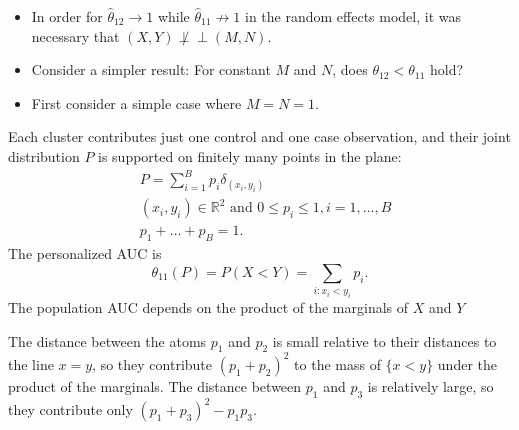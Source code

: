 \documentclass{beamer}
\renewcommand{\P}{P}
\newcommand{\cind}{\perp \!\!\! \perp}
\newcommand{\aucindiv}{\theta_{11}}%
\newcommand{\aucpop}{\theta_{12}}%
\newcommand{\aucindivhat}{\hat{\theta}_{11}}%
\newcommand{\aucpophat}{\hat{\theta}_{12}}%
\newcommand{\B}{B}
\begin{document}
\begin{frame}
  \begin{itemize}
  \item In order for $\aucpophat\to 1$ while $\aucindivhat\not\to 1$ in the
  random effects model, it
  was necessary that $(X,Y)\not\cind (M,N)$.

\item Consider a simpler result: For constant $M$ and $N$, does $\aucpop<\aucindiv$ hold?
  
\item First consider a simple case where $M=N=1.$

\end{itemize}

\end{frame}

\begin{frame}
  Each cluster contributes
  just one control and one case observation, and their joint
  distribution $\P$ is supported on finitely many points in the
  plane:  %
  \begin{align}
    &\P = \sum_{i=1}^\B p_i \delta_{(x_i,y_i)}\\
    &(x_i,y_i) \in \mathbb{R}^2 \text{ and } 0\le p_i\le 1,i=1,\ldots,B\\
    &p_1+\ldots+p_\B=1.
  \end{align}
  The personalized AUC is
  $$\aucindiv(P)=\P(X<Y)=\underset{i:x_i<y_i}{\sum} p_i.$$
  The population AUC depends on the product of the marginals  of $X$ and
  $Y$
\end{frame}

\begin{frame}
\begin{figure}[!tbp]
  \centering
\end{figure}
\footnotesize{  The
    distance between the atoms $p_1$ and $p_2$ is small relative to
    their distances to the line $x=y$, so they contribute
    $(p_1+p_2)^2$ to the mass of $\{x<y\}$ under the product of the
    marginals. The distance between $p_1$ and $p_3$ is relatively
    large, so they contribute only
    $(p_1+p_3)^2-p_1p_3$.}
\end{frame}
\end{document}
